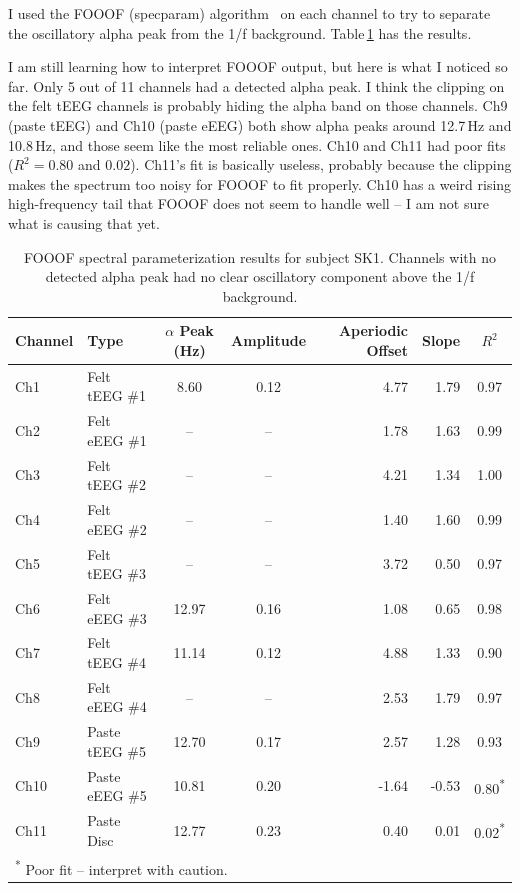 \documentclass[10pt,conference]{IEEEtran}
\begin{document}
I used the FOOOF (specparam) algorithm~\cite{donoghue2020} on each channel to try to
separate the oscillatory alpha peak from the 1/f background.
Table\,\ref{tab:fooof} has the results.

I am still learning how to interpret FOOOF output, but here is what I
noticed so far.
Only 5 out of 11 channels had a detected alpha peak. I think the
clipping on the felt tEEG channels is probably hiding the alpha band
on those channels.
Ch9 (paste tEEG) and Ch10 (paste eEEG) both show alpha peaks around
12.7\,Hz and 10.8\,Hz, and those seem like the most reliable ones.
Ch10 and Ch11 had poor fits ($R^{2} = 0.80$ and $0.02$).
Ch11's fit is basically useless, probably because the clipping makes the
spectrum too noisy for FOOOF to fit properly.
Ch10 has a weird rising high-frequency tail that FOOOF does not seem to
handle well -- I am not sure what is causing that yet.

\begin{table}[t]
  \centering
  \caption{FOOOF spectral parameterization results for subject SK1.
    Channels with no detected alpha peak had no clear oscillatory
    component above the 1/f background.}
  \label{tab:fooof}
  \renewcommand{\arraystretch}{1.2}
  \begin{tabular}{llccrrc}
    \toprule
    \textbf{Channel} & \textbf{Type} &
    \textbf{$\alpha$ Peak (Hz)} & \textbf{Amplitude} &
    \textbf{Aperiodic Offset} & \textbf{Slope} &
    \textbf{$R^{2}$} \\
    \midrule
    Ch1  & Felt tEEG \#1  &  8.60 & 0.12 &  4.77 &  1.79 & 0.97 \\
    Ch2  & Felt eEEG \#1  & --    & --   &  1.78 &  1.63 & 0.99 \\
    Ch3  & Felt tEEG \#2  & --    & --   &  4.21 &  1.34 & 1.00 \\
    Ch4  & Felt eEEG \#2  & --    & --   &  1.40 &  1.60 & 0.99 \\
    Ch5  & Felt tEEG \#3  & --    & --   &  3.72 &  0.50 & 0.97 \\
    Ch6  & Felt eEEG \#3  & 12.97 & 0.16 &  1.08 &  0.65 & 0.98 \\
    Ch7  & Felt tEEG \#4  & 11.14 & 0.12 &  4.88 &  1.33 & 0.90 \\
    Ch8  & Felt eEEG \#4  & --    & --   &  2.53 &  1.79 & 0.97 \\
    Ch9  & Paste tEEG \#5 & 12.70 & 0.17 &  2.57 &  1.28 & 0.93 \\
    Ch10 & Paste eEEG \#5 & 10.81 & 0.20 & -1.64 & -0.53 & 0.80\textsuperscript{*} \\
    Ch11 & Paste Disc     & 12.77 & 0.23 &  0.40 &  0.01 & 0.02\textsuperscript{*} \\
    \bottomrule
    \multicolumn{7}{l}{\small \textsuperscript{*} Poor fit -- interpret with caution.}
  \end{tabular}
\end{table}
\end{document}
